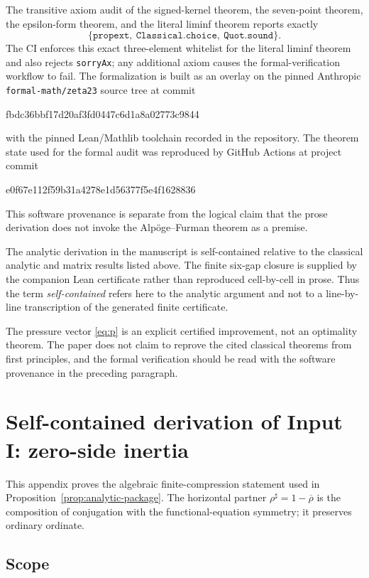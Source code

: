 \documentclass[11pt]{article}
\begin{document}
The transitive axiom audit of the signed-kernel theorem, the seven-point
theorem, the epsilon-form theorem, and the literal liminf theorem reports
exactly
\[
 \{\texttt{propext},\ \texttt{Classical.choice},\ \texttt{Quot.sound}\}.
\]
The CI enforces this exact three-element whitelist for the literal liminf
theorem and also rejects \texttt{sorryAx}; any additional axiom causes the
formal-verification workflow to fail.  The formalization is built as an overlay on
the pinned Anthropic \texttt{formal-math/zeta23} source tree at commit
\begin{center}
\small\ttfamily
fbdc36bbf17d20af3fd0447c6d1a8a02773c9844
\end{center}
with the pinned Lean/Mathlib toolchain recorded in the repository.  The theorem
state used for the formal audit was reproduced by GitHub Actions at project
commit
\begin{center}
\small\ttfamily
e0f67e112f59b31a4278e1d56377f5e4f1628836
\end{center}
This software provenance is separate from the logical claim that the prose
derivation does not invoke the Alpöge--Furman theorem as a premise.

The analytic derivation in the manuscript is self-contained relative to the
classical analytic and matrix results listed above.  The finite six-gap closure
is supplied by the companion Lean certificate rather than reproduced
cell-by-cell in prose.  Thus the term \emph{self-contained} refers here to the
analytic argument and not to a line-by-line transcription of the generated
finite certificate.

The pressure vector \eqref{eq:p} is an explicit certified improvement, not an
optimality theorem.  The paper does not claim to reprove the cited classical
theorems from first principles, and the formal verification should be read with
the software provenance in the preceding paragraph.

\appendix


\section{Self-contained derivation of Input I: zero-side inertia}\label{app:inputI}
This appendix proves the algebraic finite-compression statement used in
Proposition~\ref{prop:analytic-package}.  The horizontal partner
$\rho^\sharp=1-\overline\rho$ is the composition of conjugation with the
functional-equation symmetry; it preserves ordinary ordinate.
\subsection{Scope}
\end{document}
